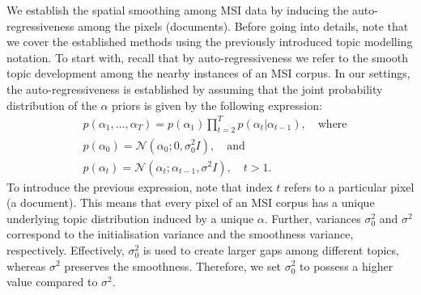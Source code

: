 \documentclass{mpaper}
\begin{document}
\par We establish the spatial smoothing among MSI data by inducing the auto-regressiveness among the pixels (documents). Before going into details, note that we cover the established methods using the previously introduced topic modelling notation. To start with, recall that by auto-regressiveness we refer to the smooth topic development among the nearby instances of an MSI corpus. In our settings, the auto-regressiveness is established by assuming that the joint probability distribution of the $\alpha$ priors is given by the following expression:
\begin{align*}
&p(\alpha_1,\ldots,\alpha_T) =p(\alpha_1)\prod_{t=2}^{T}{p(\alpha_t|\alpha_{t-1})}, \quad \mbox{where}\\
&p(\alpha_0) =\mathcal{N} (\alpha_0; 0, \sigma_0^2I), \quad \mbox{and}\\
&p(\alpha_t) =\mathcal{N} (\alpha_t; \alpha_{t-1}, \sigma^2I), \quad t>1.
\end{align*}
To introduce the previous expression, note that index $t$ refers to a particular pixel (a document). This means that every pixel of an MSI corpus has a unique underlying topic distribution induced by a unique $\alpha$. Further, variances $\sigma_0^2$ and $\sigma^2$ correspond to the initialisation variance and the smoothness variance, respectively. Effectively, $\sigma_0^2$ is used to create larger gaps among different topics, whereas $\sigma^2$ preserves the smoothness. Therefore, we set $\sigma_0^2$ to possess a higher value compared to $\sigma^2$.
\end{document}
